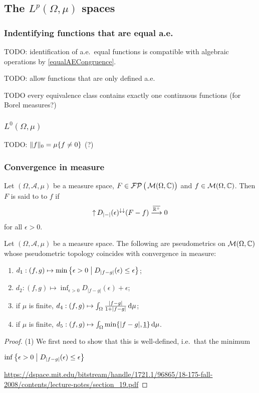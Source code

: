 \subsection{The $L^p(\Omega,\mu)$ spaces}
\subsubsection{Indentifying functions that are equal a.e.}

TODO: identification of a.e.\ equal functions is compatible with algebraic operations by \ref{equalAECongruence}.

TODO: allow functions that are only defined a.e.


\begin{proposition}
TODO every equivalence class contains exactly one continuous functions (for Borel measures?)
\end{proposition}


\subsubsection{$L^0(\Omega, \mu)$}
TODO: $\lVert f\rVert_0 = \mu\{f\neq 0\}$ (?)

\subsubsection{Convergence in measure}
\begin{definition}
Let $(\Omega, \mathcal{A}, \mu)$ be a measure space, $F\in \operatorname{\mathcal{FP}}\big(\operatorname{\mathcal{M}}(\Omega, \mathbb{C})\big)$ and $f\in \operatorname{\mathcal{M}}(\Omega, \mathbb{C})$. Then $F$ is said to  to $f$ if
\[ \operatorname{\uparrow} D_{|-|}(\epsilon)^{\downarrow\downarrow}(F-f) \overset{\overline{\mathbb{R}^+}}{\longrightarrow} 0 \]
for all $\epsilon > 0$.
\end{definition}

\begin{lemma}
Let $(\Omega, \mathcal{A}, \mu)$ be a measure space. The following are pseudometrics on $\operatorname{\mathcal{M}}(\Omega, \mathbb{C})$ whose pseudometric topology coincides with convergence in measure:
\begin{enumerate}
\item $d_1: (f,g) \mapsto \min\setbuilder[\big]{\epsilon > 0}{D_{|f-g|}(\epsilon) \leq \epsilon}$;
\item $d_2: (f,g) \mapsto \inf_{\epsilon>0} D_{|f-g|}(\epsilon) + \epsilon$;
\item if $\mu$ is finite, $d_4: (f,g) \mapsto \int_\Omega \frac{|f-g|}{1+|f-g|}\operatorname{d \!}{\mu}$;
\item if $\mu$ is finite, $d_5: (f,g) \mapsto \int_\Omega\min\{|f-g|, \underline{1}\}\operatorname{d \!}{\mu}$.
\end{enumerate}
\end{lemma}
\begin{proof}
(1) We first need to show that this is well-defined, i.e.\ that the minimum

$\inf\setbuilder[\big]{\epsilon > 0}{D_{|f-g|}(\epsilon) \leq \epsilon}$



\url{https://dspace.mit.edu/bitstream/handle/1721.1/96865/18-175-fall-2008/contents/lecture-notes/section_19.pdf}
\end{proof}

